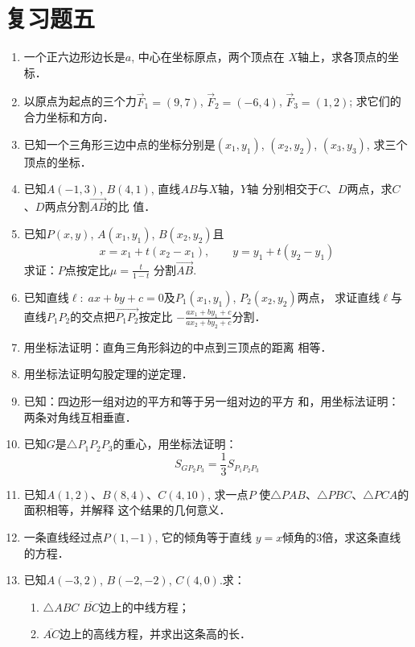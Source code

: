 \section*{复习题五}

\begin{enumerate}
    \item 一个正六边形边长是$a$, 中心在坐标原点，两个顶点在
    $X$轴上，求各顶点的坐标．
    \item 以原点为起点的三个力$\vec{F}_1=(9,7)$, $\vec{F}_2=(-6,4)$, 
    $\vec{F}_3=(1,2)$; 求它们的合力坐标和方向．
    \item 已知一个三角形三边中点的坐标分别是$(x_1,y_1)$, $(x_2,
    y_2)$, $(x_3,y_3)$, 求三个顶点的坐标．
    \item 已知$A(-1,3)$, $B(4,1)$, 直线$AB$与$X$轴，$Y$轴
    分别相交于$C$、$D$两点，求$C$、$D$两点分割$\Vec{AB}$的比
    值．
    \item 已知$P(x,y)$, $A(x_1,y_1)$, $B(x_2,y_2)$且
    \[x=x_1+t(x_2-x_1),\qquad y=y_1+t(y_2-y_1)\]
    求证：$P$点按定比$\mu=\frac{t}{1-t}$
    分割$\Vec{AB}$.
    \item 已知直线$\ell:\; ax+by+c=0$及$P_1(x_1,y_1)$, $P_2(x_2,  y_2)$两点，
    求证直线$\ell$与直线$P_1P_2$的交点把$\Vec{P_1P_2}$按定比
$-\frac{ax_1+by_1+c}{ax_2+by_2+c}$分割．
\item 用坐标法证明：直角三角形斜边的中点到三顶点的距离
相等．
\item 用坐标法证明勾股定理的逆定理．
\item 已知：四边形一组对边的平方和等于另一组对边的平方
和，用坐标法证明：两条对角线互相垂直．
\item 已知$G$是$\triangle P_1P_2P_3$的重心，用坐标法证明：
\[S_{GP_2P_3}=\frac{1}{3}S_{P_1P_2P_3}\]
\item 已知$A(1,2)$、$B(8,4)$、$C(4,10)$, 求一点$P$
使$\triangle PAB$、$\triangle PBC$、$\triangle PCA$的面积相等，并解释
这个结果的几何意义．
\item 一条直线经过点$P(1,-1)$, 它的倾角等于直线
$y=x$倾角的3倍，求这条直线的方程．
\item 已知$A(-3,2)$, $B(-2,-2)$, $C(4,0)$.求：
\begin{enumerate}
    \item $\triangle ABC$ $\overline{BC}$边上的中线方程；
    \item $\overline{AC}$边上的高线方程，并求出这条高的长．
\end{enumerate}


\end{enumerate}
